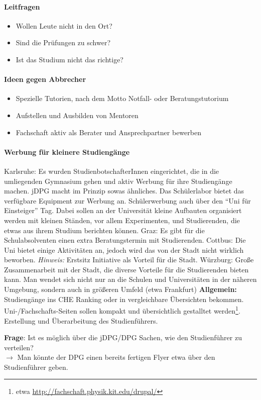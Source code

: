 		\paragraph{Leitfragen}
			\begin{itemize}
				\item Wollen Leute nicht in den Ort?
				\item Sind die Prüfungen zu schwer?
				\item Ist das Studium nicht das richtige?
			\end{itemize}

		\paragraph{Ideen gegen Abbrecher}
			\begin{itemize}
				\item Spezielle Tutorien, nach dem Motto Notfall- oder Beratungstutorium
				\item Aufstellen und Ausbilden von Mentoren
				\item Fachschaft aktiv als Berater und Ansprechpartner bewerben
			\end{itemize}

		\paragraph{Werbung für kleinere Studiengänge}
			\begin{outline}
				\1 Karlsruhe:
				  \2 Es wurden StudienbotschafterInnen eingerichtet, die in die umliegenden Gymnasium gehen und aktiv Werbung für ihre Studiengänge machen.
				  \2 jDPG macht im Prinzip sowas ähnliches.
				  \2 Das Schülerlabor bietet das verfügbare Equipment zur Werbung an.
				  \2 Schülerwerbung auch über den ``Uni für Einsteiger'' Tag. Dabei sollen an der Universität kleine Aufbauten organisiert werden mit kleinen Ständen, vor allem Experimenten, und Studierenden, die etwas aus ihrem Studium berichten können.
				\1 Graz: Es gibt für die Schulabsolventen einen extra Beratungstermin mit Studierenden.
				\1 Cottbus: Die Uni bietet einige Aktivitäten an, jedoch wird das von der Stadt nicht wirklich beworben. \textit{Hinweis:} Erstsitz Initiative als Vorteil für die Stadt.
				\1 Würzburg:
				  \2 Große Zusammenarbeit mit der Stadt, die diverse Vorteile für die Studierenden bieten kann.
				  \2 Man wendet sich nicht nur an die Schulen und Universitäten in der näheren Umgebung, sondern auch in größeren Umfeld (etwa Frankfurt)
				\1 \textbf{Allgemein:}
					\2 Studiengänge ins CHE Ranking oder in vergleichbare Übersichten bekommen.
					\2 Uni-/Fachschafts-Seiten sollen kompakt und übersichtlich gestalltet werden\footnote{etwa \url{http://fachschaft.physik.kit.edu/drupal/}}.
					\2 Erstellung und Überarbeitung des Studienführers.

				\1 \textbf{Frage}: Ist es möglich über die jDPG/DPG Sachen, wie den Studienführer zu verteilen? \\
				  $\rightarrow$ Man könnte der DPG einen bereits fertigen Flyer etwa über den Studienführer geben.
			\end{outline}

